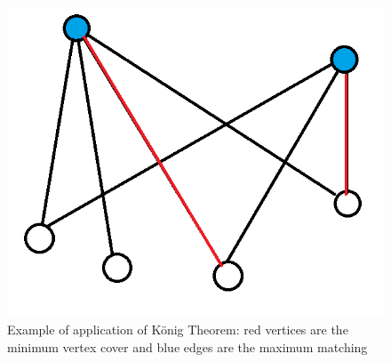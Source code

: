 

\begin{figure}[htbp]
\centering
\includegraphics[width=.60\textwidth]{Pm.png}
\caption{Example of application of K\"onig Theorem: red vertices are the minimum vertex cover and blue edges are the maximum matching}
\end{figure}

